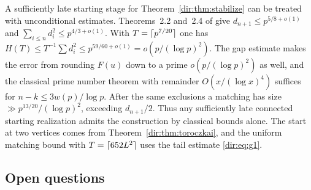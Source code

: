 \begin{remark}\label{dir:rem:graphrh}
A sufficiently late starting stage for Theorem~\ref{dir:thm:stabilize} can be treated with
unconditional estimates. Theorems~2.2 and~2.4 of \cite{ErdosEtAl2024Sequence} give
$d_{n+1}\le p^{5/8+o(1)}$ and $\sum_{i\le n}d_i^2\le p^{4/3+o(1)}$. With
$T=\lceil p^{7/20}\rceil$ one has
$H(T)\le T^{-1}\sum d_i^2\le p^{59/60+o(1)}=o(p/(\log p)^2)$. The gap estimate makes
the error from rounding $F(u)$ down to a prime $o(p/(\log p)^2)$ as well, and the
classical prime number theorem with remainder $O(x/(\log x)^4)$ suffices for
$n-k\le3w(p)/\log p$. After the same exclusions a matching has size
$\gg p^{13/20}/(\log p)^2$, exceeding $d_{n+1}/2$. Thus any sufficiently late connected
starting realization admits the construction by classical bounds alone. The start at
two vertices comes from Theorem~\ref{dir:thm:toroczkai}, and the uniform matching bound with
$T=\lceil652L^2\rceil$ uses the tail estimate \eqref{dir:eq:g1}.
\end{remark}

\subsection{Open questions}\label{dir:sec:open}

